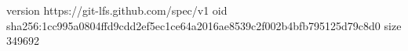 version https://git-lfs.github.com/spec/v1
oid sha256:1cc995a0804ffd9cdd2ef5ec1ce64a2016ae8539c2f002b4bfb795125d79c8d0
size 349692

